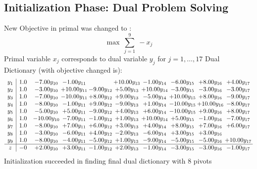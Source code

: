 \documentclass[9pt]{article}
\begin{document}
\subsection{Initialization Phase: Dual Problem Solving}
New Objective in primal was changed to : \[ \max\ \sum_{j=1}^{9}\ - x_j \] 
Primal variable $x_j$ corresponds to dual variable $y_j$ for $j = 1,\ldots,17$
Dual Dictionary (with objective changed is): 
\[\begin{array}{c| c c@{\hskip 2pt} c@{\hskip 2pt} c@{\hskip 2pt} c@{\hskip 2pt} c@{\hskip 2pt} c@{\hskip 2pt} c@{\hskip 2pt} c@{\hskip 2pt} }
 y_{1}   &  1.0 & -7.00 y_{10} & -1.00 y_{11} &   & + 10.00 y_{13} & -1.00 y_{14} & -6.00 y_{15} & +  8.00 y_{16} & +  4.00 y_{17}\\
 y_{2}   &  1.0 & -3.00 y_{10} & + 10.00 y_{11} & -9.00 y_{12} & +  5.00 y_{13} & + 10.00 y_{14} & -3.00 y_{15} & -3.00 y_{16} & -3.00 y_{17}\\
 y_{3}   &  1.0 & -7.00 y_{10} & -10.00 y_{11} & +  8.00 y_{12} & +  9.00 y_{13} & -5.00 y_{14} & + 10.00 y_{15} & +  8.00 y_{16} & -9.00 y_{17}\\
 y_{4}   &  1.0 & -8.00 y_{10} & -1.00 y_{11} & +  9.00 y_{12} & -9.00 y_{13} & +  1.00 y_{14} & -10.00 y_{15} & + 10.00 y_{16} & -8.00 y_{17}\\
 y_{5}   &  1.0 & -5.00 y_{10} & +  5.00 y_{11} & -9.00 y_{12} & +  4.00 y_{13} & +  6.00 y_{14} & -10.00 y_{15} & +  9.00 y_{16} & +  8.00 y_{17}\\
 y_{6}   &  1.0 & -10.00 y_{10} & -7.00 y_{11} & -1.00 y_{12} & +  1.00 y_{13} & + 10.00 y_{14} & +  5.00 y_{15} & -1.00 y_{16} & -7.00 y_{17}\\
 y_{7}   &  1.0 & -8.00 y_{10} & +  7.00 y_{11} & +  6.00 y_{12} & +  3.00 y_{13} & +  4.00 y_{14} & +  8.00 y_{15} & +  7.00 y_{16} & +  6.00 y_{17}\\
 y_{8}   &  1.0 & -3.00 y_{10} & -6.00 y_{11} & +  4.00 y_{12} & -2.00 y_{13} & -6.00 y_{14} & +  3.00 y_{15} & +  3.00 y_{16} &   \\
 y_{9}   &  1.0 & -8.00 y_{10} & -4.00 y_{11} & -5.00 y_{12} & +  1.00 y_{13} & -9.00 y_{14} & -5.00 y_{15} & -5.00 y_{16} & + 10.00 y_{17}\\
\hline
z    &  -0 & +  2.00 y_{10} & +  3.00 y_{11} & -1.00 y_{12} & +  2.00 y_{13} & -1.00 y_{14} & -3.00 y_{15} & -3.00 y_{16} & -1.00 y_{17}\\
\end{array}\]
Initialization succeeded in finding final dual dictionary with 8 pivots
\end{document}
